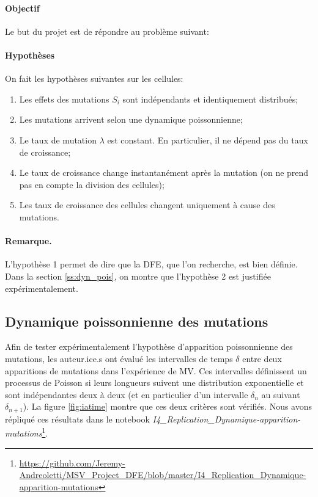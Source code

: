 \documentclass[12pt]{article}
\newcommand{\req}[1]{\paragraph{Remarque.}#1\vspace{0.1cm}}
\begin{document}
\paragraph{Objectif} Le but du projet est de répondre au problème suivant:
\vspace{5mm}



\paragraph{Hypothèses}
On fait les hypothèses suivantes sur les cellules:
\begin{enumerate}
\item Les effets des mutations $S_i$ sont indépendants et identiquement distribués;
\item Les mutations arrivent selon une dynamique poissonnienne;
\item Le taux de mutation $\lambda$ est constant. En particulier, il ne dépend pas du taux de croissance;
\item Le taux de croissance change instantanément après la mutation (on ne prend pas en compte la division des cellules);
\item Les taux de croissance des cellules changent uniquement à cause des mutations.
\end{enumerate}

\req{L'hypothèse 1 permet de dire que la DFE, que l'on recherche, est bien définie. Dans la section \ref{ss:dyn_pois}, on montre que l'hypothèse 2 est justifiée expérimentalement.}

\subsection{Dynamique poissonnienne des mutations\label{ss:dyn_pois}}

Afin de tester expérimentalement l'hypothèse d'apparition poissonnienne des mutations, les auteur.ice.s ont évalué les intervalles de temps $\delta$ entre deux apparitions de mutations dans l'expérience de MV. Ces intervalles définissent un processus de Poisson si leurs longueurs suivent une distribution exponentielle et sont indépendantes deux à deux (et en particulier d'un intervalle $\delta_n$ au suivant $\delta_{n+1}$). La figure \ref{fig:iatime} montre que ces deux critères sont vérifiés. Nous avons répliqué ces résultats dans le notebook \emph{I4\_Replication\_Dynamique-apparition-mutations}\footnote{\url{https://github.com/Jeremy-Andreoletti/MSV_Project_DFE/blob/master/I4_Replication_Dynamique-apparition-mutations}}.
\end{document}
